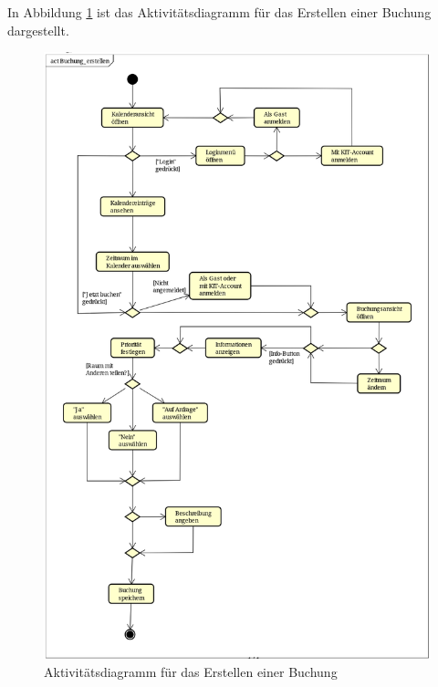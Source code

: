 In Abbildung \ref{fig:activity_diagram_booking} ist das Aktivitätsdiagramm für das Erstellen einer Buchung dargestellt.
\begin{figure}[ht]
    \centering
    \includegraphics[scale=0.20]{figures/activitydiagrams/buchungerstellen}
    \caption{Aktivitätsdiagramm für das Erstellen einer Buchung}
    \label{fig:activity_diagram_booking}
\end{figure}


\clearpage
